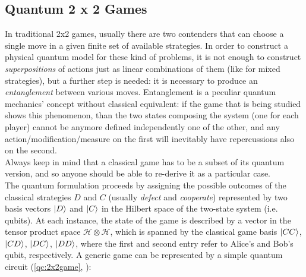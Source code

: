 \subsection{Quantum 2 x 2 Games}
In traditional 2x2 games, usually there are two contenders that can choose a single move in a given finite set of available strategies. In order to construct a physical quantum model for these kind of problems, it is not enough to construct \textit{superpositions} of actions just as linear combinations of them (like for mixed strategies), but a further step is needed: it is necessary to produce an \textit{entanglement} between various moves. Entanglement is a peculiar quantum mechanics' concept without classical equivalent: if the game that is being studied shows this phenomenon, than the two states composing the system (one for each player) cannot be anymore defined independently one of the other, and any action/modification/measure on the first will inevitably have repercussions also on the second.\\
Always keep in mind that a classical game has to be a subset of its quantum version, and so anyone should be able to re-derive it as a particular case.\\
The quantum formulation proceeds by assigning the possible outcomes of the classical strategies $D$ and $C$ (usually \textit{defect} and \textit{cooperate}) represented by two basis vectors $\ket{D}$ and $\ket{C}$ in the Hilbert space of the two-state system (i.e. qubits). At each instance, the state of the game is described by a vector in the tensor product space $\mathcal{H}\otimes\mathcal{H}$, which is spanned by
the classical game basis $\ket{CC}$, $\ket{CD}$, $\ket{DC}$, $\ket{DD}$, where
the first and second entry refer to Alice’s and Bob’s qubit,
respectively. A generic game can be represented by a simple quantum circuit (\ref{qc:2x2game}, \cite{Flitney_Abbott_introduction}):
